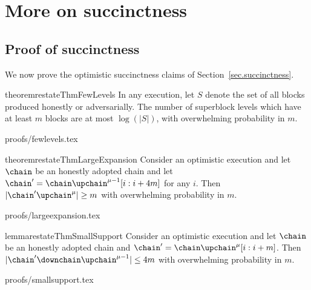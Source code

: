 \section{More on succinctness}
\label{sec.app-succinctness}

\subsection{Proof of succinctness}
We now prove the optimistic succinctness claims of
Section~\ref{sec.succinctness}.

\begin{restatable}{theorem}{restateThmFewLevels}
    \label{thm.few-levels}
    In any execution, let $S$ denote the set of all blocks produced honestly or
    adversarially. The number of superblock levels which have at least $m$
    blocks are at most $\log(|S|)$, with overwhelming probability in $m$.
\end{restatable}
{proofs/fewlevels.tex}

\begin{restatable}{theorem}{restateThmLargeExpansion}
    \label{thm.large-expansion}
    Consider an optimistic execution and let $\chain$ be an honestly adopted
    chain and let $\chain' = \chain\upchain^{\mu - 1}[i:i + 4m]$ for any $i$.
    Then $|\chain'\upchain^\mu| \geq m$ with overwhelming probability in $m$.
\end{restatable}
{proofs/largeexpansion.tex}

\begin{restatable}{lemma}{restateThmSmallSupport}
    \label{lem.small-support}
    Consider an optimistic execution and let $\chain$ be an honestly adopted
    chain and $\chain' = \chain\upchain^\mu[i:i + m]$. Then
    $|\chain'\downchain\upchain^{\mu - 1}| \leq 4m$ with overwhelming
    probability in $m$.
\end{restatable}
{proofs/smallsupport.tex}


